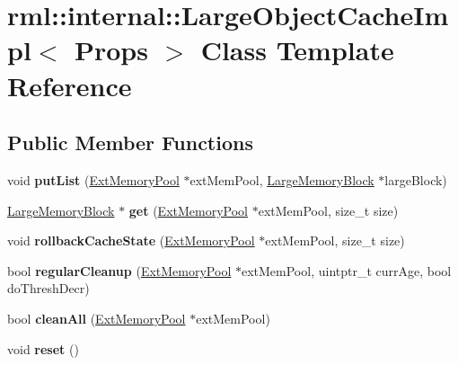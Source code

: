 \hypertarget{classrml_1_1internal_1_1LargeObjectCacheImpl}{}\section{rml\+:\+:internal\+:\+:Large\+Object\+Cache\+Impl$<$ Props $>$ Class Template Reference}
\label{classrml_1_1internal_1_1LargeObjectCacheImpl}
\subsection*{Public Member Functions}
\begin{DoxyCompactItemize}
\item 
\hypertarget{classrml_1_1internal_1_1LargeObjectCacheImpl_a162ec2746d5de5107b37018c1975e800}{}void {\bfseries put\+List} (\hyperlink{structrml_1_1internal_1_1ExtMemoryPool}{Ext\+Memory\+Pool} $\ast$ext\+Mem\+Pool, \hyperlink{structrml_1_1internal_1_1LargeMemoryBlock}{Large\+Memory\+Block} $\ast$large\+Block)\label{classrml_1_1internal_1_1LargeObjectCacheImpl_a162ec2746d5de5107b37018c1975e800}

\item 
\hypertarget{classrml_1_1internal_1_1LargeObjectCacheImpl_aff2196784c3e1fd6f293e2725ffcbbe8}{}\hyperlink{structrml_1_1internal_1_1LargeMemoryBlock}{Large\+Memory\+Block} $\ast$ {\bfseries get} (\hyperlink{structrml_1_1internal_1_1ExtMemoryPool}{Ext\+Memory\+Pool} $\ast$ext\+Mem\+Pool, size\+\_\+t size)\label{classrml_1_1internal_1_1LargeObjectCacheImpl_aff2196784c3e1fd6f293e2725ffcbbe8}

\item 
\hypertarget{classrml_1_1internal_1_1LargeObjectCacheImpl_af634b8db69c13605f63413fab5a7c867}{}void {\bfseries rollback\+Cache\+State} (\hyperlink{structrml_1_1internal_1_1ExtMemoryPool}{Ext\+Memory\+Pool} $\ast$ext\+Mem\+Pool, size\+\_\+t size)\label{classrml_1_1internal_1_1LargeObjectCacheImpl_af634b8db69c13605f63413fab5a7c867}

\item 
\hypertarget{classrml_1_1internal_1_1LargeObjectCacheImpl_acc7bea982bab2dbee4dfd53f3d24e6d3}{}bool {\bfseries regular\+Cleanup} (\hyperlink{structrml_1_1internal_1_1ExtMemoryPool}{Ext\+Memory\+Pool} $\ast$ext\+Mem\+Pool, uintptr\+\_\+t curr\+Age, bool do\+Thresh\+Decr)\label{classrml_1_1internal_1_1LargeObjectCacheImpl_acc7bea982bab2dbee4dfd53f3d24e6d3}

\item 
\hypertarget{classrml_1_1internal_1_1LargeObjectCacheImpl_a24ea3df0a9f854c36a000cd092f22ee4}{}bool {\bfseries clean\+All} (\hyperlink{structrml_1_1internal_1_1ExtMemoryPool}{Ext\+Memory\+Pool} $\ast$ext\+Mem\+Pool)\label{classrml_1_1internal_1_1LargeObjectCacheImpl_a24ea3df0a9f854c36a000cd092f22ee4}

\item 
\hypertarget{classrml_1_1internal_1_1LargeObjectCacheImpl_a275daebb41b9f7c08a20580fbecbf346}{}void {\bfseries reset} ()\label{classrml_1_1internal_1_1LargeObjectCacheImpl_a275daebb41b9f7c08a20580fbecbf346}

\end{DoxyCompactItemize}
